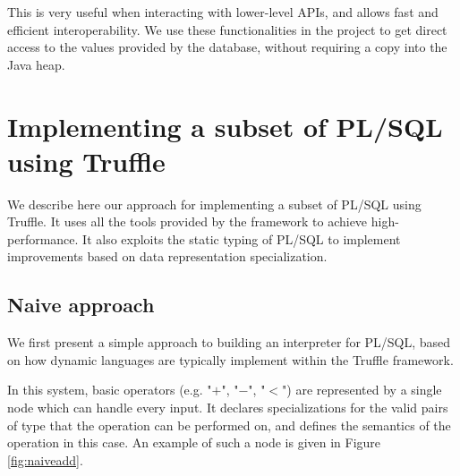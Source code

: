 \documentclass[twoside,11pt,a4paper]{article}
\newcommand{\maybe}[1]{\textit{(maybe ? #1)}}
\newcommand{\pls}[1]{\small\texttt{#1}\normalsize}
\newcommand{\plstype}[1]{\pls{#1}}
\newcommand{\plsi}{\plstype{PLS\_INTEGER}}
\newcommand{\simpleint}{\plstype{SIMPLE\_INTEGER}}
\newcommand{\startsection}[1]{
	\cleardoublepage
	\section{#1}
	\thispagestyle{basic}
}
\begin{document}
This is very useful when interacting with lower-level APIs, and allows fast and efficient interoperability. We use these functionalities in the project to get direct access to the values provided by the database, without requiring a copy into the Java heap.

\startsection{Implementing a subset of PL/SQL using Truffle}

We describe here our approach for implementing a subset of PL/SQL using Truffle. It uses all the tools provided by the framework to achieve high-performance. It also exploits the static typing of PL/SQL to implement improvements based on data representation specialization.


\subsection{Naive approach}


We first present a simple approach to building an interpreter for PL/SQL, based on how dynamic languages are typically implement within the Truffle framework.

In this system, basic operators (e.g. "$+$", "$-$", "$<$") are represented by a single node which can handle every input. It declares specializations for the valid pairs of type that the operation can be performed on, and defines the semantics of the operation in this case. An example of such a node is given in Figure \ref{fig:naiveadd}.
\end{document}
